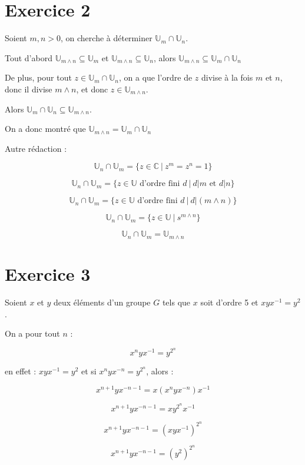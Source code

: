 \documentclass[]{article}
\theoremstyle{remark}
\theoremstyle{definition}
\begin{document}
\section*{Exercice 2}
	Soient $m, n > 0$, on cherche à déterminer $\mathbb{U}_m \cap \mathbb{U}_n$.
	
	Tout d'abord $\mathbb{U}_{m \land n} \subseteq \mathbb{U}_m$ et $\mathbb{U}_{m \land n} \subseteq \mathbb{U}_n$, alors $\mathbb{U}_{m \land n} \subseteq \mathbb{U}_m \cap \mathbb{U}_n$
	
	De plus, pour tout $z \in \mathbb{U}_m \cap \mathbb{U}_n$, on a que l'ordre de $z$ divise à la fois $m$ et $n$, donc il divise $m \land n$, et donc $z \in \mathbb{U}_{m \land n}$.
	
	Alors $\mathbb{U}_m \cap \mathbb{U}_n \subseteq \mathbb{U}_{m \land n}$.
	
	On a donc montré que $\mathbb{U}_{m \land n} = \mathbb{U}_m \cap \mathbb{U}_n$

Autre rédaction :

$$\mathbb{U}_n \cap \mathbb{U}_m = \{z \in \mathbb{C} ~ | ~ z^m = z^n = 1 \}$$

$$\mathbb{U}_n \cap \mathbb{U}_m = \{z \in \mathbb{U} \text{ d'ordre fini } d ~ | ~ d | m \text{ et } d | n\}$$

$$\mathbb{U}_n \cap \mathbb{U}_m = \{z \in \mathbb{U} \text{ d'ordre fini } d ~ | ~ d | (m \land n)\}$$

$$\mathbb{U}_n \cap \mathbb{U}_m = \{z \in \mathbb{U} ~ | ~ s^{m \land n}\}$$

$$\mathbb{U}_n \cap \mathbb{U}_m = \mathbb{U}_{m \land n}$$

\section*{Exercice 3}
	Soient $x$ et $y$ deux éléments d'un groupe $G$ tels que $x$ soit d'ordre 5 et $xyx^{-1}=y^2$.
	
	On a pour tout $n$ :
	
	$$x^n y x^{-1} = y^{2^n}$$
	
	en effet : $x y x^{-1} = y^2$ et si $x^n y x^{-n} = y^{2^n}$, alors :
	
	$$x^{n+1} y x^{-n-1} = x\left(x^n y x^{-n}\right)x^{-1}$$

	$$x^{n+1} y x^{-n-1} = xy^{2^n}x^{-1}$$

	$$x^{n+1} y x^{-n-1} = \left(xyx^{-1}\right)^{2^n}$$

	$$x^{n+1} y x^{-n-1} = \left(y^2\right)^{2^n}$$
\end{document}
